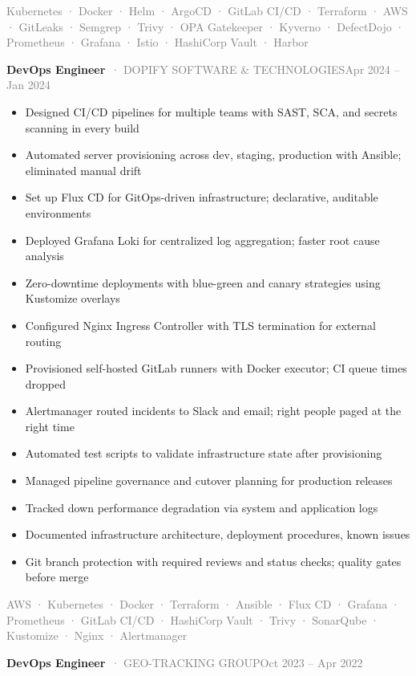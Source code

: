 \documentclass[10pt,a4paper]{article}
\newcommand{\cventry}[3]{\textbf{#1}\ \textcolor{graytext}{· #2}\hfill\textcolor{graytext}{\small #3}\par}
\newcommand{\tagline}[1]{\textcolor{graytext}{\small #1}\par}
\begin{document}
\tagline{Kubernetes · Docker · Helm · ArgoCD · GitLab CI/CD · Terraform · AWS · GitLeaks · Semgrep · Trivy · OPA Gatekeeper · Kyverno · DefectDojo · Prometheus · Grafana · Istio · HashiCorp Vault · Harbor}
\vspace{1pt}
\vspace{3pt}
\cventry{DevOps Engineer}{DOPIFY SOFTWARE \& TECHNOLOGIES}{Apr 2024 – Jan 2024}
\begin{itemize}
  \item Designed CI/CD pipelines for multiple teams with SAST, SCA, and secrets scanning in every build
  \item Automated server provisioning across dev, staging, production with Ansible; eliminated manual drift
  \item Set up Flux CD for GitOps-driven infrastructure; declarative, auditable environments
  \item Deployed Grafana Loki for centralized log aggregation; faster root cause analysis
  \item Zero-downtime deployments with blue-green and canary strategies using Kustomize overlays
  \item Configured Nginx Ingress Controller with TLS termination for external routing
  \item Provisioned self-hosted GitLab runners with Docker executor; CI queue times dropped
  \item Alertmanager routed incidents to Slack and email; right people paged at the right time
  \item Automated test scripts to validate infrastructure state after provisioning
  \item Managed pipeline governance and cutover planning for production releases
  \item Tracked down performance degradation via system and application logs
  \item Documented infrastructure architecture, deployment procedures, known issues
  \item Git branch protection with required reviews and status checks; quality gates before merge
\end{itemize}
\tagline{AWS · Kubernetes · Docker · Terraform · Ansible · Flux CD · Grafana · Prometheus · GitLab CI/CD · HashiCorp Vault · Trivy · SonarQube · Kustomize · Nginx · Alertmanager}
\vspace{1pt}
\vspace{3pt}
\cventry{DevOps Engineer}{GEO-TRACKING GROUP}{Oct 2023 – Apr 2022}
\end{document}
